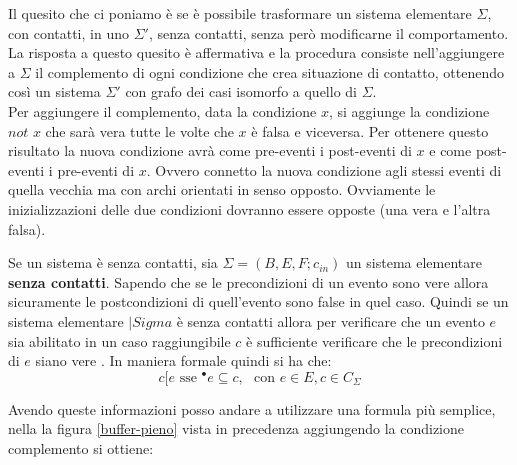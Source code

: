 Il quesito che ci poniamo è se è possibile trasformare un sistema elementare $\Sigma$, con contatti, in uno $\Sigma'$, senza contatti, senza però modificarne il comportamento.\\ 
La risposta a questo quesito è affermativa e la procedura consiste nell'aggiungere a $\Sigma$ il complemento di ogni condizione che crea situazione di contatto, ottenendo così un sistema $\Sigma'$ con grafo dei casi isomorfo a quello di $\Sigma$.\\ 

Per aggiungere il complemento, data la condizione $x$, si aggiunge la condizione $not\,\, x$ che sarà vera tutte le volte che $x$ è falsa e viceversa. Per ottenere questo risultato la nuova condizione avrà come pre-eventi i post-eventi di $x$ e come post-eventi i pre-eventi di $x$. Ovvero connetto la nuova condizione agli stessi eventi di quella vecchia ma con archi orientati in senso opposto. Ovviamente le inizializzazioni delle due condizioni dovranno essere opposte (una vera e l'altra falsa).

Se un sistema è senza contatti, sia $\Sigma = (B,E,F;c_{in})$ un sistema elementare \textbf{senza contatti}. Sapendo che se le precondizioni di un evento sono vere allora sicuramente le postcondizioni di quell'evento sono false in quel caso. Quindi se un sistema elementare $|Sigma$ è senza contatti allora per verificare che un evento $e$ sia abilitato in un caso raggiungibile $c$ è sufficiente verificare che le precondizioni di $e$ siano vere . In maniera formale quindi si ha che: 
\[c[e\mbox{ sse } ^\bullet e\subseteq c,\,\,\mbox{ con } e\in E,c\in C_\Sigma\] 

Avendo queste informazioni posso andare a utilizzare una formula più semplice, nella la figura \ref{buffer-pieno} vista in precedenza aggiungendo la condizione complemento si ottiene:

